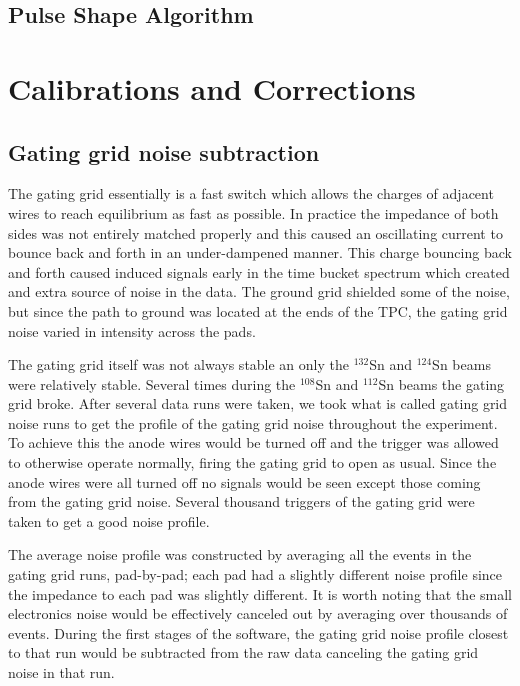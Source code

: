 \subsection{Pulse Shape Algorithm}
\label{sec:psa}

\section{Calibrations and Corrections}


\subsection{Gating grid noise subtraction}
The gating grid essentially is a fast switch which allows the charges of adjacent wires to reach equilibrium as fast as possible. In practice the impedance of both sides was not entirely matched properly and this caused an oscillating current to bounce back and forth in an under-dampened manner. This charge bouncing back and forth caused induced signals early in the time bucket spectrum which created and extra source of noise in the data. The ground grid shielded some of the noise, but since the path to ground was located at the ends of the TPC, the gating grid noise varied in intensity across the pads. 

The gating grid itself was not always stable an only the ${}^{132}$Sn and ${}^{124}$Sn beams were relatively stable. Several times during the ${}^{108}$Sn and ${}^{112}$Sn beams the gating grid broke. After several data runs were taken, we took what is called gating grid noise runs to get the profile of the gating grid noise throughout the experiment. To achieve this the anode wires would be turned off and the trigger was allowed to otherwise operate normally, firing the gating grid to open as usual. Since the anode wires were all turned off no signals would be seen except those coming from the gating grid noise. Several thousand triggers of the gating grid were taken to get a good noise profile. 

The average noise profile was constructed by averaging all the events in the gating grid runs, pad-by-pad; each pad had a slightly different noise profile since the impedance to each pad was slightly different. It is worth noting that the small electronics noise would be effectively canceled out by averaging over thousands of events. During the first stages of the software, the gating grid noise profile closest to that run would be subtracted from the raw data canceling the gating grid noise in that run. 




